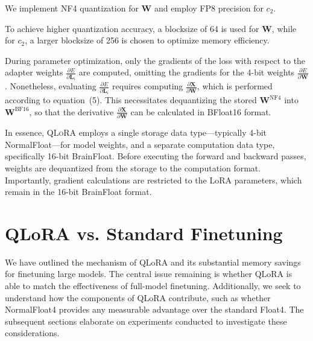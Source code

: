 We implement NF4 quantization for $\mathbf{W}$ and employ FP8 precision for $c_2$.

To achieve higher quantization accuracy, a blocksize of 64 is used for $\mathbf{W}$, while for $c_2$, a larger blocksize of 256 is chosen to optimize memory efficiency.

During parameter optimization, only the gradients of the loss with respect to the adapter weights $\frac{\partial E}{\partial \mathbf{L}_i}$ are computed, omitting the gradients for the 4-bit weights $\frac{\partial E}{\partial \mathbf{W}}$. Nonetheless, evaluating $\frac{\partial E}{\partial \mathbf{L}_i}$ requires computing $\frac{\partial \mathbf{X}}{\partial \mathbf{W}}$, which is performed according to equation~(5). This necessitates dequantizing the stored $\mathbf{W}^{\text{NF4}}$ into $\mathbf{W}^{\text{BF16}}$, so that the derivative $\frac{\partial \mathbf{X}}{\partial \mathbf{W}}$ can be calculated in BFloat16 format.

In essence, \textsc{QLoRA} employs a single storage data type—typically 4-bit NormalFloat—for model weights, and a separate computation data type, specifically 16-bit BrainFloat. Before executing the forward and backward passes, weights are dequantized from the storage to the computation format. Importantly, gradient calculations are restricted to the LoRA parameters, which remain in the 16-bit BrainFloat format.

\section{QLoRA vs. Standard Finetuning}
\label{sec:comp_to_std}

We have outlined the mechanism of QLoRA and its substantial memory savings for finetuning large models. The central issue remaining is whether QLoRA is able to match the effectiveness of full-model finetuning. Additionally, we seek to understand how the components of QLoRA contribute, such as whether NormalFloat4 provides any measurable advantage over the standard Float4. The subsequent sections elaborate on experiments conducted to investigate these considerations.

